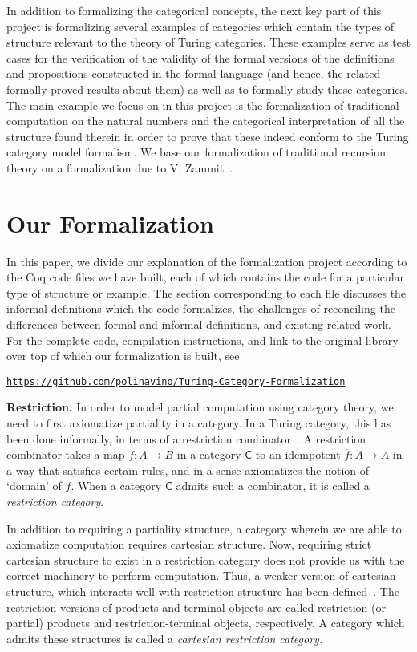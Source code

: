 \documentclass{entcs} \usepackage{entcsmacro}
\begin{document}
In addition to formalizing the categorical concepts, the next key part of this project is formalizing several examples of categories which contain the types of structure relevant to the theory of Turing categories. These examples serve as test cases for the verification of the validity of the formal versions of the definitions and propositions constructed in the formal language (and hence, the related formally proved results about them) as well as to formally study these categories. The main example we focus on in this project is the formalization of traditional computation on the natural numbers and the categorical interpretation of all the structure found therein in order to prove that these indeed conform to the Turing category model formalism. We base our formalization of traditional recursion theory on a formalization due to V. Zammit~\cite{SmnForm}. 

\section{Our Formalization}

In this paper, we divide our explanation of the formalization project according to the Coq code files we have built, each of which contains the code for a particular type of structure or example. The section corresponding to each file discusses the informal definitions which the code formalizes, the challenges of reconciling the differences between formal and informal definitions, and existing related work. For the complete code, compilation instructions, and link to the original library over top of which our formalization is built, see

\href{https://github.com/polinavino/Turing-Category-Formalization}
{\texttt{https://github.com/polinavino/Turing-Category-Formalization}}


{\bfseries Restriction.} In order to model partial computation using category theory, we need to first axiomatize partiality in a category. In a Turing category, this has been done informally, in terms of a restriction combinator~\cite{Restriction}. A restriction combinator takes a map $f : A \to B$ in a category $\mathsf{C}$ to an idempotent $\overline{f} : A \to A$ in a way that satisfies certain rules, and  in a sense axiomatizes the notion of `domain' of $f$. When a category $\mathsf{C}$ admits such a combinator, it is called a {\em restriction category}. 

In addition to requiring a partiality structure, a category wherein we are able to axiomatize computation requires cartesian structure. Now, requiring strict cartesian structure to exist in a restriction category does not provide us with the correct machinery to perform computation. Thus, a weaker version of cartesian structure, which interacts well with restriction structure has been defined~\cite{Turing}. The restriction versions of products and terminal objects are called restriction (or partial) products and restriction-terminal objects, respectively. A category which admits these structures is called a {\em cartesian restriction category.} 
\end{document}
